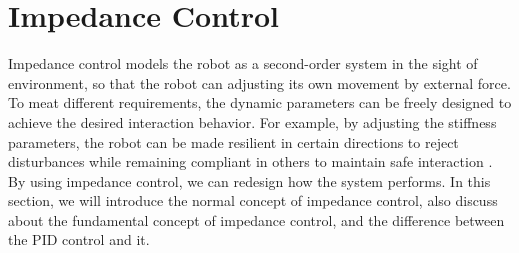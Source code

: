 \section{Impedance Control}
Impedance control models the robot as a second-order system in the sight of environment, so that the robot can adjusting its own movement by external force. To meat different requirements, the dynamic parameters can be freely designed to achieve the desired interaction behavior.
For example, by adjusting the stiffness parameters, the robot can be made resilient in certain directions to reject disturbances while remaining compliant in others to maintain safe interaction \cite{bodie_2020_active}. By using impedance control, we can redesign how the system performs. In this section, we will introduce the normal concept of impedance control, also discuss about the fundamental concept of impedance control, and the difference between the PID control and it. 
